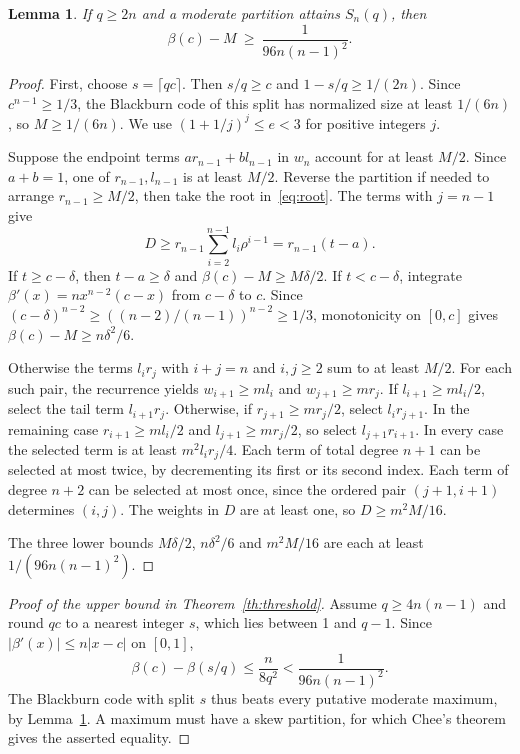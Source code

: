 \documentclass[11pt,a4paper]{article}
\newtheorem{lemma}[theorem]{Lemma}
\newcommand{\ceil}[1]{\lceil #1\rceil}
\begin{document}
\begin{lemma}\label{lem:gap}
If $q\ge2n$ and a moderate partition attains $S_n(q)$, then
\[
 \beta(c)-M\ \ge\ \frac{1}{96n(n-1)^2}.
\]
\end{lemma}
\begin{proof}
First, choose $s=\ceil{qc}$. Then $s/q\ge c$ and $1-s/q\ge1/(2n)$. Since $c^{n-1}\ge1/3$, the Blackburn code of this split has normalized size at least $1/(6n)$, so $M\ge1/(6n)$. We use $(1+1/j)^j\le e<3$ for positive integers $j$.

Suppose the endpoint terms $ar_{n-1}+bl_{n-1}$ in $w_n$ account for at least $M/2$. Since $a+b=1$, one of $r_{n-1},l_{n-1}$ is at least $M/2$. Reverse the partition if needed to arrange $r_{n-1}\ge M/2$, then take the root in~\eqref{eq:root}. The terms with $j=n-1$ give
\[
 D\ge r_{n-1}\sum_{i=2}^{n-1} l_i\rho^{i-1}
       = r_{n-1}(t-a).
\]
If $t\ge c-\delta$, then $t-a\ge\delta$ and $\beta(c)-M\ge M\delta/2$. If $t<c-\delta$, integrate $\beta'(x)=nx^{n-2}(c-x)$ from $c-\delta$ to $c$. Since $(c-\delta)^{n-2}\ge((n-2)/(n-1))^{n-2}\ge1/3$, monotonicity on $[0,c]$ gives $\beta(c)-M\ge n\delta^2/6$.

Otherwise the terms $l_i r_j$ with $i+j=n$ and $i,j\ge2$ sum to at least $M/2$. For each such pair, the recurrence yields $w_{i+1}\ge m l_i$ and $w_{j+1}\ge m r_j$. If $l_{i+1}\ge ml_i/2$, select the tail term $l_{i+1}r_j$. Otherwise, if $r_{j+1}\ge mr_j/2$, select $l_i r_{j+1}$. In the remaining case $r_{i+1}\ge ml_i/2$ and $l_{j+1}\ge mr_j/2$, so select $l_{j+1}r_{i+1}$. In every case the selected term is at least $m^2 l_i r_j/4$. Each term of total degree $n+1$ can be selected at most twice, by decrementing its first or its second index. Each term of degree $n+2$ can be selected at most once, since the ordered pair $(j+1,i+1)$ determines $(i,j)$. The weights in $D$ are at least one, so $D\ge m^2 M/16$.

The three lower bounds $M\delta/2$, $n\delta^2/6$ and $m^2M/16$ are each at least $1/(96n(n-1)^2)$.
\end{proof}

\begin{proof}[Proof of the upper bound in Theorem~\ref{th:threshold}]
Assume $q\ge4n(n-1)$ and round $qc$ to a nearest integer $s$, which lies between 1 and $q-1$. Since $|\beta'(x)|\le n|x-c|$ on $[0,1]$,
\[
 \beta(c)-\beta(s/q)\le\frac{n}{8q^2}<
 \frac{1}{96n(n-1)^2}.
\]
The Blackburn code with split $s$ thus beats every putative moderate maximum, by Lemma~\ref{lem:gap}. A maximum must have a skew partition, for which Chee's theorem gives the asserted equality.
\end{proof}
\end{document}
